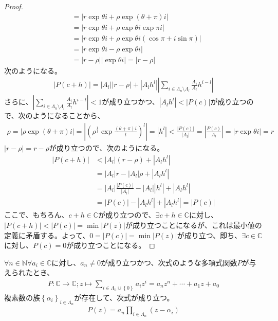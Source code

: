 \documentclass[dvipdfmx]{jsarticle}
\begin{document}
\begin{proof}
\begin{align*}
&= \left| r\exp{\theta i} + \rho\exp{(\theta + \pi)i} \right|\\
&= \left| r\exp{\theta i} + \rho\exp{\theta i}\exp{\pi i} \right|\\
&= \left| r\exp{\theta i} + \rho\exp{\theta i}\left( \cos\pi + i\sin\pi \right) \right|\\
&= \left| r\exp{\theta i} - \rho\exp{\theta i} \right|\\
&= |r - \rho|\left| \exp{\theta i} \right| = |r - \rho|
\end{align*}
次のようになる。
\begin{align*}
\left| P(c + h) \right| = \left| A_{l} \right||r - \rho| + \left| A_{l}h^{l} \right|\left| \sum_{i \in \varLambda_{n} \setminus \varLambda_{l}} {\frac{A_{i}}{A_{l}}h^{i - l}} \right|
\end{align*}
さらに、$\left| \sum_{i \in \varLambda_{n} \setminus \varLambda_{l}} {\frac{A_{i}}{A_{l}}h^{i - l}} \right| < 1$が成り立つかつ、$\left| A_{l}h^{l} \right| < \left| P(c) \right|$が成り立つので、次のようになることから、
\begin{align*}
\rho = \left| \rho\exp{(\theta + \pi)i} \right| = \left| \left( \rho^{\frac{1}{l}}\exp\frac{(\theta + \pi)i}{l} \right)^{l} \right| = \left| h^{l} \right| < \frac{\left| P(c) \right|}{\left| A_{l} \right|} = \left| \frac{P(c)}{A_{l}} \right| = \left| r\exp{\theta i} \right| = r
\end{align*}
$|r - \rho| = r - \rho$が成り立つので、次のようになる。
\begin{align*}
\left| P(c + h) \right| &< \left| A_{l} \right|(r - \rho) + \left| A_{l}h^{l} \right|\\
&= \left| A_{l} \right|r - \left| A_{l} \right|\rho + \left| A_{l}h^{l} \right|\\
&= \left| A_{l} \right|\frac{\left| P(c) \right|}{\left| A_{l} \right|} - \left| A_{l} \right|\left| h^{l} \right| + \left| A_{l}h^{l} \right|\\
&= \left| P(c) \right| - \left| A_{l}h^{l} \right| + \left| A_{l}h^{l} \right| = \left| P(c) \right|
\end{align*}
ここで、もちろん、$c + h \in \mathbb{C}$が成り立つので、$\exists c + h \in \mathbb{C}$に対し、$\left| P(c + h) \right| < \left| P(c) \right| = \min\left| P(z) \right|$が成り立つことになるが、これは最小値の定義に矛盾する。よって、$0 = \left| P(c) \right| = \min\left| P(z) \right|$が成り立つ、即ち、$\exists c \in \mathbb{C}$に対し、$P(c) = 0$が成り立つことになる。
\end{proof}
\begin{thm}\label{4.3.2.11}
$\forall n \in \mathbb{N}\forall a_{i} \in \mathbb{C}$に対し、$a_{n} \neq 0$が成り立つかつ、次式のような多項式関数$P$が与えられたとき、
\begin{align*}
P:\mathbb{C} \rightarrow \mathbb{C};z \mapsto \sum_{i \in \varLambda_{n} \cup \left\{ 0 \right\}} {a_{i}z^{i}} = a_{n}z^{n} + \cdots + a_{1}z + a_{0}
\end{align*}
複素数の族$\left\{ \alpha_{i} \right\}_{i \in \varLambda_{n}}$が存在して、次式が成り立つ。
\begin{align*}
P(z) = a_{n}\prod_{i \in \varLambda_{n}} \left( z - \alpha_{i} \right)
\end{align*}
\end{thm}
\end{document}
